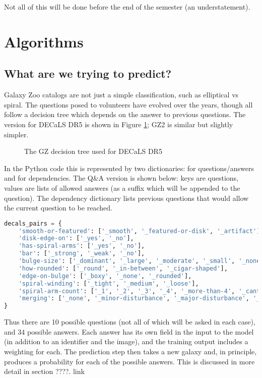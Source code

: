 \documentclass[preprint]{aastex631}
\newcommand{\todo}{\color{red}{TODO}\color{black}\hspace{2mm}}
\begin{document}
Not all of this will be done before the end of the semester (an understatement).

\section{Algorithms} \label{algorithms}

\subsection{What are we trying to predict?}

Galaxy Zoo catalogs are not just a simple classification, such as elliptical vs spiral. The questions posed to volunteers have evolved over the years, though all follow a decision tree which depends on the answer to previous questions. The version for DECaLS DR5 is shown in Figure \ref{fig:decals_decisions}; GZ2 is similar but slightly simpler.

\begin{figure}[htb!]
	\caption{The GZ decision tree used for DECaLS DR5
		\label{fig:decals_decisions}}
\end{figure}

In the Python code this is represented by two dictionaries: for questions/answers and for dependencies. The Q\&A version is shown below: keys are questions, values are lists of allowed answers (as a suffix which will be appended to the question). The dependency dictionary lists previous questions that would allow the current question to be reached.

\newpage
\begin{lstlisting}[language=Python]
decals_pairs = {
	'smooth-or-featured': ['_smooth', '_featured-or-disk', '_artifact'],
	'disk-edge-on': ['_yes', '_no'],
	'has-spiral-arms': ['_yes', '_no'],
	'bar': ['_strong', '_weak', '_no'],
	'bulge-size': ['_dominant', '_large', '_moderate', '_small', '_none'],
	'how-rounded': ['_round', '_in-between', '_cigar-shaped'],
	'edge-on-bulge': ['_boxy', '_none', '_rounded'],
	'spiral-winding': ['_tight', '_medium', '_loose'],
	'spiral-arm-count': ['_1', '_2', '_3', '_4', '_more-than-4', '_cant-tell'],
	'merging': ['_none', '_minor-disturbance', '_major-disturbance', '_merger']
}
\end{lstlisting}

Thus there are 10 possible questions (not all of which will be asked in each case), and 34 possible answers. Each answer has its own field in the input to the model (in addition to an identifier and the image), and the training output includes a weighting for each. The prediction step then takes a new galaxy and, in principle, produces a probability for each of the possible answers. This is discussed in more detail in section ????.
\todo link
\end{document}
